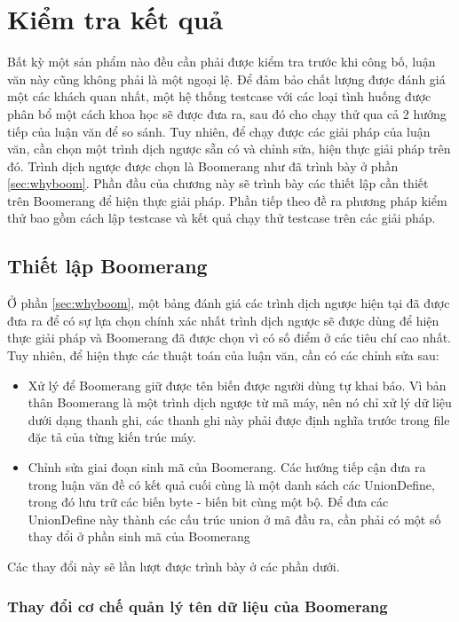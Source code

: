\chapter{Kiểm tra kết quả}

Bất kỳ một sản phẩm nào đều cần phải được kiểm tra trước khi công bố, luận văn này cũng không phải là một ngoại lệ. Để đảm bảo chất lượng được đánh giá một các khách quan nhất, một hệ thống testcase với các loại tình huống được phân bổ một cách khoa học sẽ được đưa ra, sau đó cho chạy thử qua cả 2 hướng tiếp của luận văn để so sánh. Tuy nhiên, để chạy được các giải pháp của luận văn, cần chọn một trình dịch ngược sẵn có và chỉnh sửa, hiện thực giải pháp trên đó. Trình dịch ngược được chọn là Boomerang như đã trình bày ở phần \ref{sec:whyboom}. Phần đầu của chương này sẽ trình bày các thiết lập cần thiết trên Boomerang để hiện thực giải pháp. Phần tiếp theo đề ra phương pháp kiểm thử bao gồm cách lập testcase và kết quả chạy thử testcase trên các giải pháp.

\section{Thiết lập Boomerang}

\label{sec:boomchange}
Ở phần \ref{sec:whyboom}, một bảng đánh giá các trình dịch ngược hiện tại đã được đưa ra để có sự lựa chọn chính xác nhất trình dịch ngược sẽ được dùng để hiện thực giải pháp và Boomerang đã được chọn vì có số điểm ở các tiêu chí cao nhất. Tuy nhiên, để hiện thực các thuật toán của luận văn, cần có các chỉnh sửa sau:
\begin{itemize}
	\item Xử lý để Boomerang giữ được tên biến được người dùng tự khai báo. Vì bản thân Boomerang là một trình dịch ngược từ mã máy, nên nó chỉ xử lý dữ liệu dưới dạng thanh ghi, các thanh ghi này phải được định nghĩa trước trong file đặc tả của từng kiến trúc máy.
	\item Chỉnh sửa giai đoạn sinh mã của Boomerang. Các hướng tiếp cận đưa ra trong luận văn đề có kết quả cuối cùng là một danh sách các UnionDefine, trong đó lưu trữ các biến byte - biến bit cùng một bộ. Để đưa các UnionDefine này thành các cấu trúc union ở mã đầu ra, cần phải có một số thay đổi ở phần sinh mã của Boomerang
\end{itemize}
Các thay đổi này sẽ lần lượt được trình bày ở các phần dưới.

\subsection{Thay đổi cơ chế quản lý tên dữ liệu của Boomerang}

